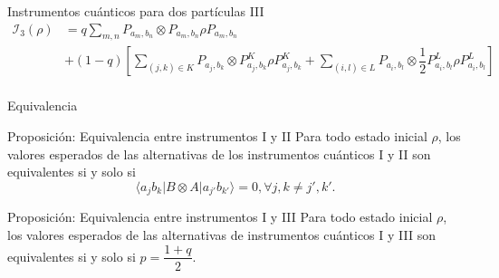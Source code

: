 \documentclass[svgnames,12pt,aspectratio=149]{beamer}
\newcommand{\ra}{\rangle}
\newcommand{\la}{\langle}
\begin{document}
\begin{frame}{Instrumentos cuánticos para dos partículas III}
  \begin{equation*}\label{eq:quantum-instrument-3-desarrollo}
    \begin{split}
        \mathcal{I}_3(\rho)&=q\sum_{m,n}  P_{a_m,b_n}\otimes P_{a_m,b_n}\rho P_{a_m,b_n}\\
        &+(1-q)\left[\sum_{(j,k)\in K}P_{a_j,b_k} \otimes P^{K}_{a_j,b_k}\rho P^{K}_{a_j,b_k}+\sum_{(i,l) \in L}P_{a_i,b_l} \otimes  \dfrac{1}{2}P^{L}_{a_i,b_l}\rho P^L_{a_i,b_l}\right]\\
    \end{split}
\end{equation*}
\begin{figure}[H]
    \centering
{}
\caption*{} 
\end{figure} 
\end{frame}

\begin{frame}{Equivalencia}
  \begin{block}{Proposición: Equivalencia entre instrumentos I y II}
    Para todo estado inicial $\rho$, los valores esperados de las alternativas
de los instrumentos cuánticos I y II son equivalentes si y solo si \begin{equation*}\label{eq:Condicion-equivalencia1-2}
    \la a_j
b_k|B\otimes A|a_{j'}b_{k'}\ra=0, \forall j,k\ne j',k'.
\end{equation*}
\end{block}



\begin{block}{Proposición: Equivalencia entre instrumentos I y III}
    Para todo estado inicial $\rho$, los valores esperados de las alternativas
de instrumentos cuánticos I y III son equivalentes si y solo si
$p=\dfrac{1+q}{2}$.
\end{block}
\end{frame}
\end{document}
